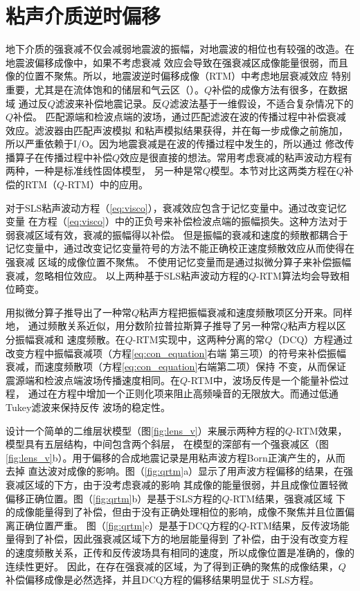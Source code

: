 \vspace{0.5cm}
\section{粘声介质逆时偏移}

地下介质的强衰减不仅会减弱地震波的振幅，对地震波的相位也有较强的改造。在地震波偏移成像中，如果不考虑衰减
效应会导致在强衰减区成像能量很弱，而且像的位置不聚焦。所以，地震波逆时偏移成像（RTM）中考虑地层衰减效应
特别重要，尤其是在流体饱和的储层和气云区（）。$Q$补偿的成像方法有很多，在数据域
通过反$Q$滤波来补偿地震记录。反$Q$滤波法基于一维假设，不适合复杂情况下的$Q$补偿。
匹配源端和检波点端的波场，通过匹配滤波在波的传播过程中补偿衰减效应。滤波器由匹配声波模拟
和粘声模拟结果获得，并在每一步成像之前施加，所以严重依赖于I/O。因为地震衰减是在波的传播过程中发生的，所以通过
修改传播算子在传播过程中补偿$Q$效应是很直接的想法。常用考虑衰减的粘声波动方程有两种，一种是标准线性固体模型，
另一种是常$Q$模型。本节对比这两类方程在$Q$补偿的RTM（$Q$-RTM）中的应用。

对于SLS粘声波动方程（\ref{eq:visco}），衰减效应包含于记忆变量中。通过改变记忆变量
在方程（\ref{eq:visco}）中的正负号来补偿检波点端的振幅损失。这种方法对于弱衰减区域有效，衰减的振幅得以补偿。
但是振幅的衰减和速度的频散都耦合于记忆变量中，通过改变记忆变量符号的方法不能正确校正速度频散效应从而使得在强衰减
区域的成像位置不聚焦。 不使用记忆变量而是通过拟微分算子来补偿振幅衰减，忽略相位效应。
以上两种基于SLS粘声波动方程的$Q$-RTM算法均会导致相位畸变。

 用拟微分算子推导出了一种常$Q$粘声方程把振幅衰减和速度频散项区分开来。同样地，
通过频散关系近似，用分数阶拉普拉斯算子推导了另一种常$Q$粘声方程以区分振幅衰减和
速度频散。在$Q$-RTM实现中，这两种分离的常$Q$（DCQ）方程通过改变方程中振幅衰减项（方程\ref{eq:con_equation}右端
第三项）的符号来补偿振幅衰减，而速度频散项（方程\ref{eq:con_equation}右端第二项）保持
不变，从而保证震源端和检波点端波场传播速度相同。在$Q$-RTM中，波场反传是一个能量补偿过程，
通过在方程中增加一个正则化项来阻止高频噪音的无限放大。而通过低通Tukey滤波来保持反传
波场的稳定性。

设计一个简单的二维层状模型（图\ref{fig:lens_v}）来展示两种方程的$Q$-RTM效果，模型具有五层结构，中间包含两个斜层，
在模型的深部有一个强衰减区（图\ref{fig:lens_v}b）。用于偏移的合成地震记录是用粘声波方程Born正演产生的，从而去掉
直达波对成像的影响。图（\ref{fig:qrtm}a）显示了用声波方程偏移的结果，在强衰减区域的下方，由于没考虑衰减的影响
其成像的能量很弱，并且成像位置轻微偏移正确位置。图（\ref{fig:qrtm}b）是基于SLS方程的$Q$-RTM结果，强衰减区域
下的成像能量得到了补偿，但由于没有正确处理相位的影响，成像不聚焦并且位置偏离正确位置严重。
图（\ref{fig:qrtm}c）是基于DCQ方程的$Q$-RTM结果，反传波场能量得到了补偿，因此强衰减区域下方的地层能量得到
了补偿，由于没有改变方程的速度频散关系，正传和反传波场具有相同的速度，所以成像位置是准确的，像的连续性更好。
因此，在存在强衰减的区域，为了得到正确的聚焦的成像结果，$Q$补偿偏移成像是必然选择，并且DCQ方程的偏移结果明显优于
SLS方程。

